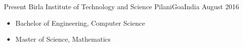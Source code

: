 %
%
%
\begin{educations}
  \education
    {Present}   {Birla Institute of Technology and Science Pilani}{Goa}{India}
    {August 2016} {
                      \begin{itemize}
                        \item Bachelor of Engineering, Computer Science
                        \item Master of Science, Mathematics
                      \end{itemize}
                    }
\end{educations}
\vspace{-3mm}

